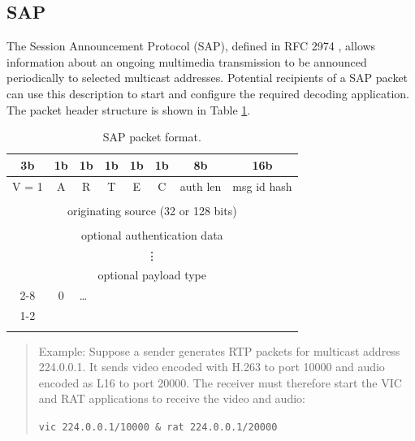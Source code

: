 \subsection{SAP}
The Session Announcement Protocol (SAP), defined in RFC 2974 \cite{RFC-2974-SAP-Protocol}, allows information about an ongoing multimedia transmission to be announced periodically to selected multicast addresses. Potential recipients of a SAP packet can use this description to start and configure the required decoding application. The packet header structure is shown in Table \ref{tab:SAP-packet-format}.

\begin{table}[htp]
\centering
\begin{tabular}[t]{|c|c|c|c|c|c|c|c|}
3b & 1b & 1b & 1b & 1b & 1b & 8b & 16b \\
\hline	V = 1 & A & R & T & E & C & auth len & msg id hash \\
\hline	\multicolumn{8}{|c|}{} \\
		\multicolumn{8}{|c|}{originating source (32 or 128 bits)} \\
		\multicolumn{8}{|c|}{} \\
\hline	\multicolumn{8}{|c|}{optional authentication data} \\
		\multicolumn{8}{|c|}{\vdots} \\
\hline	\multicolumn{8}{|c|}{optional payload type} \\
		\cline{2-8}
		\multicolumn{1}{|r|}{\ldots} & 0 & \multicolumn{6}{|l|}{\ldots} \\
		\cline{1-2}
		\multicolumn{8}{|c|}{payload} \\
		\multicolumn{8}{|c|}{} \\
\hline
\end{tabular}
\caption{SAP packet format.}
\label{tab:SAP-packet-format}
\end{table}

\begin{quote}
Example: Suppose a sender generates RTP packets for multicast address 224.0.0.1. It sends video encoded with H.263 to port 10000 and audio encoded as L16 to port 20000. The receiver must therefore start the VIC and RAT applications to receive the video and audio:

\verb|vic 224.0.0.1/10000 & rat 224.0.0.1/20000|
\end{quote}

